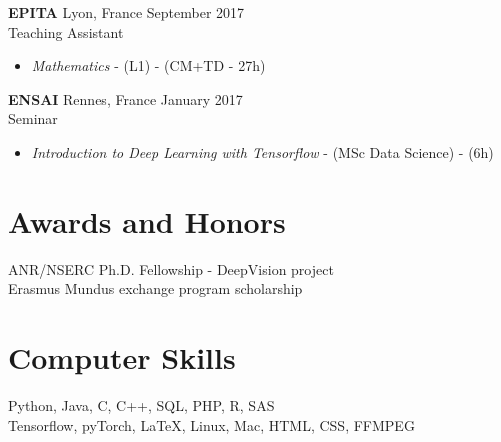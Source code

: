 \documentclass[10pt]{res} %
\begin{document}
\begin{resume}
\textbf{EPITA} \hfill Lyon, France \hfill September 2017 \\
Teaching Assistant
\begin{itemize}
	\item \textit{Mathematics} - (L1) - (CM+TD - 27h)
\end{itemize}

\textbf{ENSAI} \hfill Rennes, France \hfill January 2017 \\
Seminar
\begin{itemize}
\item \textit{Introduction to Deep Learning with Tensorflow} - (MSc Data Science) - (6h)
\end{itemize}


\section{\large Awards and Honors} 
ANR/NSERC Ph.D. Fellowship - DeepVision project \\
Erasmus Mundus exchange program scholarship


\section{\large Computer Skills} 
Python, Java, C, C++, SQL, PHP, R, SAS \\
Tensorflow, pyTorch, \LaTeX, Linux, Mac, HTML, CSS, FFMPEG \\

\end{resume}
\end{document}
